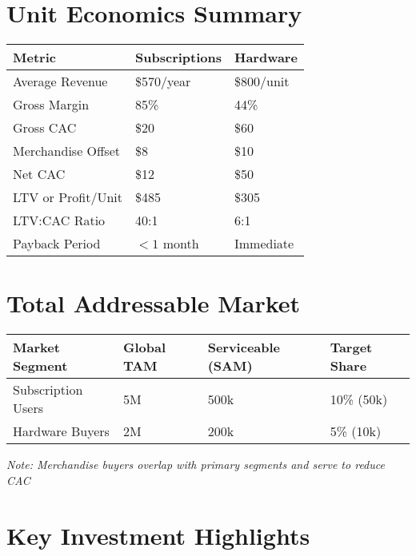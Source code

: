 \documentclass[11pt]{article}
\newcommand{\cacDigital}{20}
\newcommand{\cacEvents}{60}
\newcommand{\merchOffsetHw}{10}
\newcommand{\tamSubsGlobal}{5M}
\newcommand{\samSubs}{500k}
\newcommand{\targetShareSubs}{10}
\newcommand{\tamHwGlobal}{2M}
\newcommand{\samHw}{200k}
\newcommand{\targetShareHw}{5}
\begin{document}
\section{Unit Economics Summary}

\begin{table}[H]
\centering
\begin{tabularx}{\linewidth}{l Y Y}
\toprule
Metric & Subscriptions & Hardware \\\midrule
Average Revenue & \$570/year & \$800/unit \\
Gross Margin\cite{openview2023} & 85\% & 44\% \\
Gross CAC & \$\cacDigital & \$\cacEvents \\
Merchandise Offset & \$8 & \$\merchOffsetHw \\
Net CAC & \$12 & \$50 \\
LTV or Profit/Unit & \$485 & \$305 \\
LTV:CAC Ratio & 40:1 & 6:1 \\
Payback Period & $<1$ month & Immediate \\
\bottomrule
\end{tabularx}
\end{table}

\section{Total Addressable Market}

\begin{table}[H]
\centering
\begin{tabularx}{\linewidth}{l Y Y Y}
\toprule
Market Segment & Global TAM\cite{chainalysis2024,triple2023} & Serviceable (SAM) & Target Share \\\midrule
Subscription Users & \tamSubsGlobal & \samSubs & \targetShareSubs\% (50k) \\
Hardware Buyers & \tamHwGlobal & \samHw & \targetShareHw\% (10k) \\
\bottomrule
\end{tabularx}
\end{table}
\textit{Note: Merchandise buyers overlap with primary segments and serve to reduce CAC}

\section{Key Investment Highlights}
\end{document}

